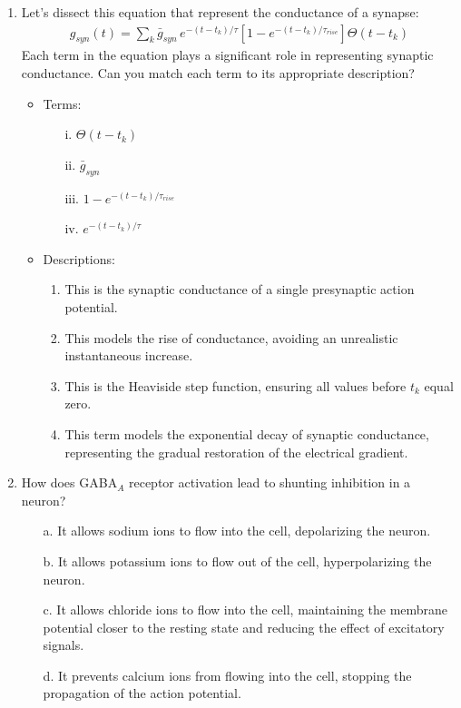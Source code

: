 \documentclass[11pt,letterpaper]{article}
\begin{document}
\begin{enumerate}
    \item Let's dissect this equation that represent the conductance of a synapse:
    \begin{align*}
        g_{syn} (t) = \sum_k \bar{g}_{syn} \, e^{-(t-t_k)/\tau} \left[ 1 - e^{-(t-t_k)/\tau_{rise}} \right] \Theta (t - t_k)
    \end{align*}
    Each term in the equation plays a significant role in representing synaptic conductance. Can you match each term to its appropriate description?
    \begin{itemize}
        \item Terms: 
        \begin{enumerate}
            \item[i.] $\Theta (t - t_k)$
            \item[ii.] $\bar{g}_{syn}$
            \item[iii.] $1 - e^{-(t-t_k)/\tau_{rise}}$
            \item[iv.] $e^{-(t-t_k)/\tau}$
        \end{enumerate}
    \end{itemize}
    \begin{itemize}
        \item Descriptions: 
        \begin{enumerate}
            \item This is the synaptic conductance of a single presynaptic action potential.
            \item This models the rise of conductance, avoiding an unrealistic instantaneous increase.
            \item This is the Heaviside step function, ensuring all values before $t_k$ equal zero.
            \item This term models the exponential decay of synaptic conductance, representing the gradual restoration of the electrical gradient.
        \end{enumerate}
    \end{itemize}

    \pagebreak

    \item How does GABA$_A$ receptor activation lead to shunting inhibition in a neuron?
    \begin{enumerate}
        \item [a.] It allows sodium ions to flow into the cell, depolarizing the neuron.
        \item [b.] It allows potassium ions to flow out of the cell, hyperpolarizing the neuron.
        \item [c.] It allows chloride ions to flow into the cell, maintaining the membrane potential closer to the resting state and reducing the effect of excitatory signals.
        \item [d.] It prevents calcium ions from flowing into the cell, stopping the propagation of the action potential.
    \end{enumerate}

    
    \end{enumerate}
\pagebreak
\end{document}

